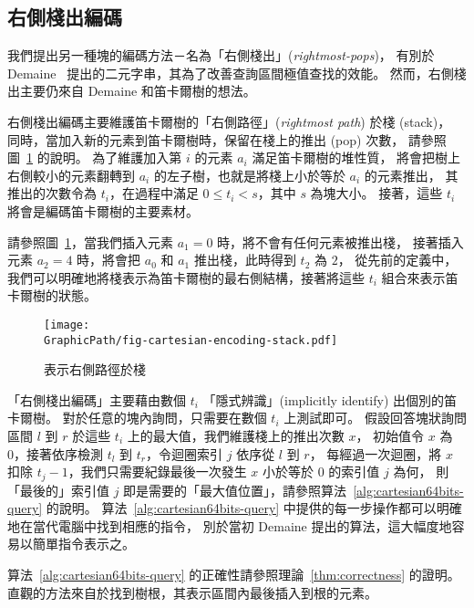 \subsection{右側棧出編碼} \label{sec:cct}

我們提出另一種塊的編碼方法－名為「右側棧出」({\em rightmost-pops})，
有別於 Demaine~\cite{Demaine2009OnCT} 提出的二元字串，其為了改善查詢區間極值查找的效能。
然而，右側棧出主要仍來自 Demaine 和笛卡爾樹的想法。


右側棧出編碼主要維護笛卡爾樹的「右側路徑」({\em rightmost path}) 於棧 (stack)，
同時，當加入新的元素到笛卡爾樹時，保留在棧上的推出 (pop) 次數，
請參照圖~\ref{fig:interval-cartesian} 的說明。
為了維護加入第 $i$ 的元素 $a_i$ 滿足笛卡爾樹的堆性質，
將會把樹上右側較小的元素翻轉到 $a_i$ 的左子樹，也就是將棧上小於等於 $a_i$ 的元素推出，
其推出的次數令為 $t_i$，在過程中滿足 $0 \le t_i < s$，其中 $s$ 為塊大小。
接著，這些 $t_i$ 將會是編碼笛卡爾樹的主要素材。

請參照圖~\ref{fig:interval-cartesian}，當我們插入元素 $a_1 = 0$ 時，將不會有任何元素被推出棧，
接著插入元素 $a_2 = 4$ 時，將會把 $a_0$ 和 $a_1$ 推出棧，此時得到 $t_2$ 為 $2$，
從先前的定義中，我們可以明確地將棧表示為笛卡爾樹的最右側結構，接著將這些 $t_i$ 組合來表示笛卡爾樹的狀態。

\begin{figure}[!thb]
  \centering
  \texttt{[image: \\GraphicPath/fig-cartesian-encoding-stack.pdf]}
  \caption{表示右側路徑於棧}
  \label{fig:interval-cartesian}
\end{figure}

「右側棧出編碼」主要藉由數個 $t_i$ 「隱式辨識」(implicitly identify) 出個別的笛卡爾樹。
對於任意的塊內詢問，只需要在數個 $t_i$ 上測試即可。
假設回答塊狀詢問區間 $l$ 到 $r$ 於這些 $t_i$ 上的最大值，我們維護棧上的推出次數 $x$，
初始值令 $x$ 為 0，接著依序檢測 $t_l$ 到 $t_r$，令迴圈索引 $j$ 依序從 $l$ 到 $r$，
每經過一次迴圈，將 $x$ 扣除 $t_j - 1$，我們只需要紀錄最後一次發生 $x$ 小於等於 0 的索引值 $j$ 為何，
則「最後的」索引值 $j$ 即是需要的「最大值位置」，請參照算法~\ref{alg:cartesian64bits-query} 的說明。
算法~\ref{alg:cartesian64bits-query} 中提供的每一步操作都可以明確地在當代電腦中找到相應的指令，
別於當初 Demaine 提出的算法，這大幅度地容易以簡單指令表示之。



算法~\ref{alg:cartesian64bits-query} 的正確性請參照理論~\ref{thm:correctness} 的證明。
直觀的方法來自於找到樹根，其表示區間內最後插入到根的元素。

